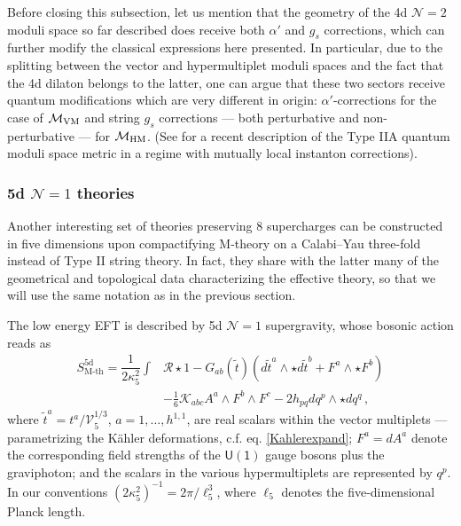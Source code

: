 Before closing this subsection, let us mention that the geometry of the 4d $\mathcal{N}=2$ moduli space so far described does receive both $\alpha'$ and $g_s$ corrections, which can further modify the classical expressions here presented. In particular, due to the splitting between the vector and hypermultiplet moduli spaces and the fact that the 4d dilaton belongs to the latter, one can argue that these two sectors receive quantum modifications which are very different in origin: $\alpha'$-corrections for the case of $\mathcal{M}_{\rm VM}$ and string $g_s$ corrections --- both perturbative and non-perturbative --- for $\mathcal{M}_{\rm HM}$. (See \cite{Cortes:2021vdm} for a recent description of the Type IIA quantum moduli space metric in a regime with mutually local instanton corrections).


\subsubsection{5d $\mathcal{N}=1$ theories}
\label{sss:5dMtheory}
	
Another interesting set of theories preserving 8 supercharges can be constructed in five dimensions upon compactifying M-theory on a Calabi--Yau three-fold instead of Type II string theory. In fact, they share with the latter many of the geometrical and topological data characterizing the effective theory, so that we will use the same notation as in the previous section.

The low energy EFT is described by 5d $\mathcal{N}=1$ supergravity, whose bosonic action reads as \cite{Cadavid:1995bk,Ferrara:1996hh,Ferrara:1996wv}
%
\begin{equation}\label{eq:Mthyaction5d}
	\begin{aligned}
		S^{\text{5d}}_{\text{M-th}}= \dfrac{1}{2\kappa^2_5} \int &  \mathcal{R} \star 1 -  G_{a b} (\tilde t)\left( d \tilde{t}^a\wedge \star d \tilde{t}^b  + F^a \wedge \star F^b \right) \\ 
		&- \frac{1}{6} \mathcal{K}_{a b c} A^a \wedge F^b \wedge F^c- 2 h_{pq}d  q^p \wedge \star d  q^q \, , 
	\end{aligned}
\end{equation}
%
where $ \tilde{t}^a=t^a/\mathcal{V}_5^{1/3}$, $a=1, \ldots, h^{1,1}$, are real scalars within the vector multiplets --- parametrizing the K\"ahler deformations, c.f. eq. \eqref{Kahlerexpand}; $F^a=dA^a$ denote the corresponding field strengths of the $\mathsf{U(1)}$ gauge bosons plus the graviphoton; and the scalars in the various hypermultiplets are represented by $q^p$. In our conventions $(2\kappa^2_5)^{-1}= 2 \pi/ \ell_{5}^3$, where $\ell_{5}$ denotes the five-dimensional Planck length.

